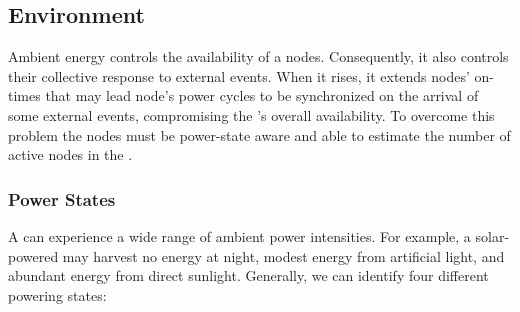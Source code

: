 \subsection{Environment}
Ambient energy controls the availability of a \cis nodes.  Consequently, it also controls their collective response to external events. When it rises, it extends nodes' on-times that may lead node's power cycles to be synchronized on the arrival of some external events, compromising the \cis's overall availability. To overcome this problem the \cis nodes must be power-state aware and able to estimate the number of active nodes in the \cis.
%
\subsubsection{Power States}
\label{sec:power_state}
A \cis can experience a wide range of ambient power intensities. For example, a solar-powered \cis may harvest no energy at night, modest energy from artificial light, and abundant energy from direct sunlight.  Generally, we can identify four different \cis powering states: 
